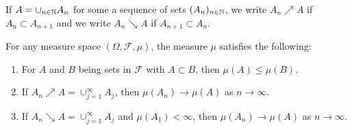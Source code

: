 If $A = \cup_{n \in \mathbb{N}}A_n$ for some a sequence of sets $(A_n)_{n \in \mathbb{N}}$, we write $A_n \nearrow A$ if $A_n \subset A_{n+1}$ and we write $A_n \searrow A$ if $A_{n+1} \subset A_n$.

\begin{proposition}
  For any measure space $(\Omega, \mathcal{F}, \mu)$, the measure $\mu$ satisfies the following:
  \begin{enumerate}[label=(\alph*)]
    \item For $A$ and $B$ being sets in $\mathcal{F}$ with $A \subset B$, then $\mu(A) \leq \mu(B)$.
    \item If $A_n \nearrow A=\cup_{j=1}^{\infty}A_j$, then $\mu(A_n) \to \mu(A)$ as $n \to \infty$.
    \item If $A_n \searrow A=\cup_{j=1}^{\infty}A_j$ and $\mu(A_1) < \infty$, then $\mu(A_n) \to \mu(A)$ as $n \to \infty$.
  \end{enumerate}
\end{proposition}
